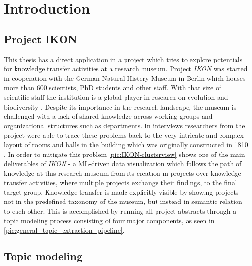 %
\chapter{Introduction}
\label{chap:introduction}

\section{Project IKON}

This thesis has a direct application in a project which tries to explore potentials for knowledge transfer activities at a research museum. Project \textit{IKON} was started in cooperation with the German Natural History Museum in Berlin which houses more than 600  scientists, PhD students and other staff. With that size of scientific staff the institution is a global player in research on evolution and biodiversity \cite{IntroducingMuseumFur}. Despite its importance in the research landscape, the museum is challenged with a lack of shared knowledge across working groups and organizational structures such as departments. In interviews researchers from the project were able to trace these problems back to the very intricate and complex layout of rooms and halls in the building which was originally constructed in 1810 \cite{140JahreAltes2018}. In order to mitigate this problem \autoref{pic:IKON-clusterview} shows one of the main deliverables of \textit{IKON} - a ML-driven data visualization which follows the path of knowledge at this research museum from its creation in projects over knowledge transfer activities, where multiple projects exchange their findings, to the final target group. Knowledge transfer is made explicitly visible by showing projects not in the predefined taxonomy of the museum, but instead in semantic relation to each other. This is accomplished by running all project abstracts through a topic modeling process consisting of four major components, as seen in \autoref{pic:general_topic_extraction_pipeline}. 

\section{Topic modeling}

